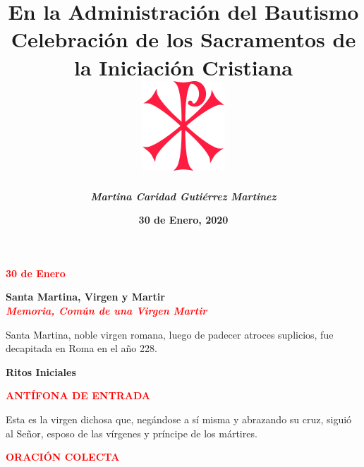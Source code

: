 \documentclass[12pt, letterpaper]{report}
\begin{document}
\title{
    \Huge \bfseries En la Administraci\'on del Bautismo \\
    \large Celebraci\'on de los Sacramentos de la Iniciaci\'on Cristiana \\
    \vspace{2em}
    \includegraphics{cruz_cristo}
}
\author{
    \Large \em \bfseries Martina Caridad Guti\'errez Martinez \\
}
\date{\bfseries 30 de Enero, 2020}

\maketitle

\begin{center}
\Large {\bfseries \textcolor{red}{30 de Enero}}
\end{center}

\begin{center}
\Huge {\bfseries Santa Martina, Virgen y Martir} \\
\Large {\bfseries \em \textcolor{red}{Memoria, Com\'un de una Virgen Martir}}
\end{center}

\Large {Santa Martina, noble virgen romana, luego de padecer atroces suplicios, fue decapitada en Roma en el a\~no 228.} \newline

\begin{center}
\Huge {\bfseries Ritos Iniciales}
\end{center}

\Large {\bfseries \textcolor{red}{ANT\'IFONA DE ENTRADA} } \newline

\Large {Esta es la virgen dichosa que, neg\'andose a s\'i misma y abrazando su cruz, sigui\'o al Se\~nor, esposo de las v\'irgenes y pr\'incipe de los m\'artires.} \newline


\Large {\bfseries \textcolor{red}{ORACI\'ON COLECTA}}
\end{document}
